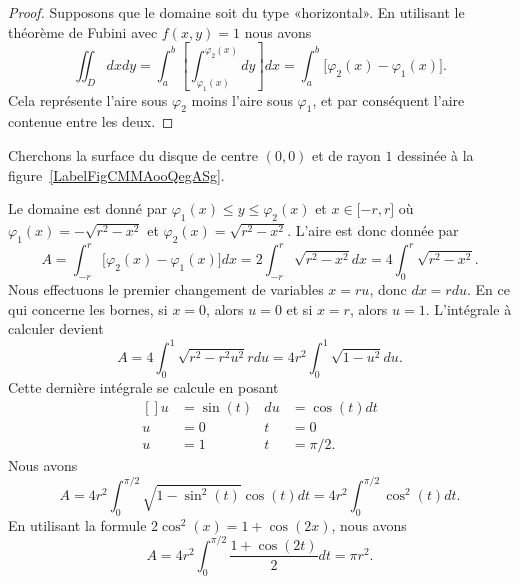 \begin{proof}
    Supposons que le domaine soit du type «horizontal». En utilisant le théorème de Fubini avec $f(x,y)=1$ nous avons
    \begin{equation}
        \iint_Ddxdy=\int_a^b\left[ \int_{\varphi_1(x)}^{\varphi_2(x)}dy \right]dx=\int_a^b\big[ \varphi_2(x)-\varphi_1(x) \big].
    \end{equation}
    Cela représente l'aire sous $\varphi_2$ moins l'aire sous $\varphi_1$, et par conséquent l'aire contenue entre les deux.
\end{proof}

\begin{example}
    Cherchons la surface du disque de centre $(0,0)$ et de rayon $1$ dessinée à la figure~\ref{LabelFigCMMAooQegASg}. %
\newcommand{\CaptionFigCMMAooQegASg}{En bleu, la fonction $\sqrt{r^2-x^2}$ et en rouge, la fonction $-\sqrt{r^2-x^2}$.}


    Le domaine est donné par $\varphi_1(x)\leq y\leq \varphi_2(x)$ et $x\in\mathopen[ -r ,r \mathclose]$ où $\varphi_1(x)=-\sqrt{r^2-x^2}$ et $\varphi_2(x)=\sqrt{r^2-x^2}$. L'aire est donc donnée par
    \begin{equation}
        A=\int_{-r}^r\big[ \varphi_2(x)-\varphi_1(x) \big]dx=2\int_{-r}^r\sqrt{r^2-x^2}dx=4\int_0^r\sqrt{r^2-x^2}.
    \end{equation}
    Nous effectuons le premier changement de variables $x=ru$, donc $dx=rdu$. En ce qui concerne les bornes, si $x=0$, alors $u=0$ et si $x=r$, alors $u=1$. L'intégrale à calculer devient
    \begin{equation}
        A=4\int_0^1\sqrt{r^2-r^2u^2}rdu=4r^2\int_0^1\sqrt{1-u^2}du.
    \end{equation}
    Cette dernière intégrale se calcule en posant
    \begin{equation}
        \begin{aligned}[]
            u&=\sin(t)&du&=\cos(t)dt\\
            u&=0&t&=0\\
            u&=1&t&=\pi/2.
        \end{aligned}
    \end{equation}
    Nous avons
    \begin{equation}
        A=4r^2\int_0^{\pi/2}\sqrt{1-\sin^2(t)}\cos(t)dt=4r^2\int_0^{\pi/2}\cos^2(t)dt.
    \end{equation}
    En utilisant la formule $2\cos^2(x)=1+\cos(2x)$, nous avons
    \begin{equation}
        A=4r^2\int_0^{\pi/2}\frac{ 1+\cos(2t) }{ 2 }dt=\pi r^2.
    \end{equation}
\end{example}

